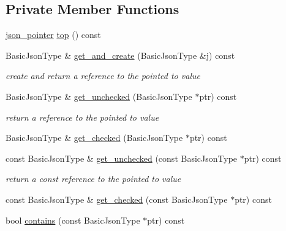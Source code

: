 \subsection*{Private Member Functions}
\begin{DoxyCompactItemize}
\item 
\hyperlink{classnlohmann_1_1json__pointer}{json\+\_\+pointer} \hyperlink{classnlohmann_1_1json__pointer_ab4a90e3f1e3c6a75073caaa03a062022}{top} () const 
\item 
Basic\+Json\+Type \& \hyperlink{classnlohmann_1_1json__pointer_a7f6f4c2f21a183a6431bf1c5d23bb3c8}{get\+\_\+and\+\_\+create} (Basic\+Json\+Type \&j) const 
\begin{DoxyCompactList}\small\item\em create and return a reference to the pointed to value \end{DoxyCompactList}\item 
Basic\+Json\+Type \& \hyperlink{classnlohmann_1_1json__pointer_a585d16983947717ed470526aca6f561b}{get\+\_\+unchecked} (Basic\+Json\+Type $\ast$ptr) const 
\begin{DoxyCompactList}\small\item\em return a reference to the pointed to value \end{DoxyCompactList}\item 
Basic\+Json\+Type \& \hyperlink{classnlohmann_1_1json__pointer_a2ca435ff12d67e6f485960b66249244c}{get\+\_\+checked} (Basic\+Json\+Type $\ast$ptr) const 
\item 
const Basic\+Json\+Type \& \hyperlink{classnlohmann_1_1json__pointer_afba3cd5a640f9c727d2be5f7346b159e}{get\+\_\+unchecked} (const Basic\+Json\+Type $\ast$ptr) const 
\begin{DoxyCompactList}\small\item\em return a const reference to the pointed to value \end{DoxyCompactList}\item 
const Basic\+Json\+Type \& \hyperlink{classnlohmann_1_1json__pointer_a2fef6c493f8f54ecdf452cf49908d164}{get\+\_\+checked} (const Basic\+Json\+Type $\ast$ptr) const 
\item 
bool \hyperlink{classnlohmann_1_1json__pointer_aa3bbc65f80fbc991d35446f0bf46ddfb}{contains} (const Basic\+Json\+Type $\ast$ptr) const 
\end{DoxyCompactItemize}
